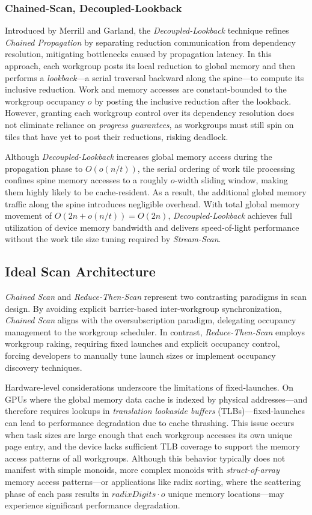 \documentclass[sigconf]{acmart}
\begin{document}
\subsubsection{Chained-Scan, Decoupled-Lookback}
Introduced by Merrill and Garland, the \emph{Decoupled-Lookback} technique refines \emph{Chained Propagation} by separating reduction communication from dependency resolution, mitigating bottlenecks caused by propagation latency. In this approach, each workgroup posts its local reduction to global memory and then performs a \emph{lookback}---a serial traversal backward along the spine---to compute its inclusive reduction. Work and memory accesses are constant-bounded to the workgroup occupancy $o$ by posting the inclusive reduction after the lookback. However, granting each workgroup control over its dependency resolution does not eliminate reliance on \emph{progress guarantees}, as workgroups must still spin on tiles that have yet to post their reductions, risking deadlock.

Although \emph{Decoupled-Lookback} increases global memory access during the propagation phase to $O(o(n/t))$, the serial ordering of work tile processing confines spine memory accesses to a roughly $o$-width sliding window, making them highly likely to be cache-resident. As a result, the additional global memory traffic along the spine introduces negligible overhead. With total global memory movement of $O(2n+o(n/t))= O(2n)$, \emph{Decoupled-Lookback} achieves full utilization of device memory bandwidth and delivers speed-of-light performance without the work tile size tuning required by \emph{Stream-Scan}.

\subsection{Ideal Scan Architecture}
\emph{Chained Scan} and \emph{Reduce-Then-Scan} represent two contrasting paradigms in scan design. By avoiding explicit barrier-based inter-workgroup synchronization, \emph{Chained Scan} aligns with the oversubscription paradigm, delegating occupancy management to the workgroup scheduler. In contrast, \emph{Reduce-Then-Scan} employs workgroup raking, requiring fixed launches and explicit occupancy control, forcing developers to manually tune launch sizes or implement occupancy discovery techniques.

Hardware-level considerations underscore the limitations of fixed-launches. On GPUs where the global memory data cache is indexed by physical addresses---and therefore requires lookups in \emph{translation lookaside buffers} (TLBs)---fixed-launches can lead to performance degradation due to cache thrashing. This issue occurs when task sizes are large enough that each workgroup accesses its own unique page entry, and the device lacks sufficient TLB coverage to support the memory access patterns of all workgroups. Although this behavior typically does not manifest with simple monoids, more complex monoids with \emph{struct-of-array} memory access patterns---or applications like radix sorting, where the scattering phase of each pass results in $radixDigits \cdot o$ unique memory locations---may experience significant performance degradation.
\end{document}

